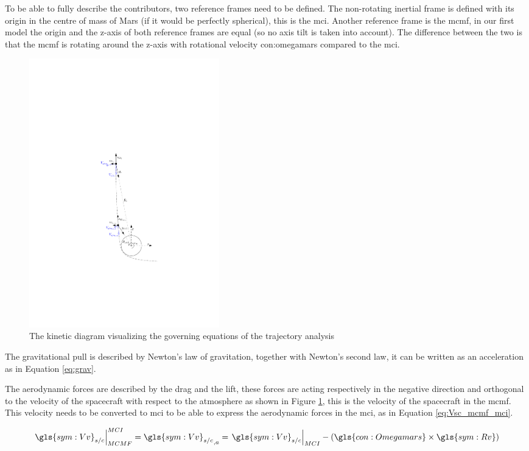 To be able to fully describe the contributors, two reference frames need to be defined. The non-rotating inertial frame is defined with its origin in the centre of mass of Mars (if it would be perfectly spherical), this is the \gls{mci}. Another reference frame is the \gls{mcmf}, in our first model the origin and the z-axis of both reference frames are equal (so no axis tilt is taken into account). The difference between the two is that the \gls{mcmf} is rotating around the z-axis with rotational velocity \gls{con:omegamars} compared to the \gls{mci}.

\begin{figure}
		\centering
		\includegraphics[width = 0.4\textwidth]{Figure/orbital_mechanics.pdf}
		\caption{The kinetic diagram visualizing the governing equations of the trajectory analysis}
		\label{fig:orb}
		\vspace{-1cm}
\end{figure}

The gravitational pull is described by Newton's law of gravitation, together with Newton's second law, it can be written as an acceleration as in Equation \ref{eq:grav}.

The aerodynamic forces are described by the drag and the lift, these forces are acting respectively in the negative direction and orthogonal to the velocity of the spacecraft with respect to the atmosphere as shown in Figure \ref{fig:orb}, this is the velocity of the spacecraft in the \gls{mcmf}. This velocity needs to be converted to \gls{mci} to be able to express the aerodynamic forces in the \gls{mci}, as in Equation \ref{eq:Vsc_mcmf_mci}.

\begin{equation} \label{eq:Vsc_mcmf_mci}
\left.\gls{sym:Vv}_{s/c}\right|_{MCMF}^{MCI} = {\gls{sym:Vv}_{s/c}}_{,a} = \left.\gls{sym:Vv}_{s/c}\right|_{MCI} - \left(\gls{con:Omegamars} \times \gls{sym:Rv} \right)
\end{equation}

